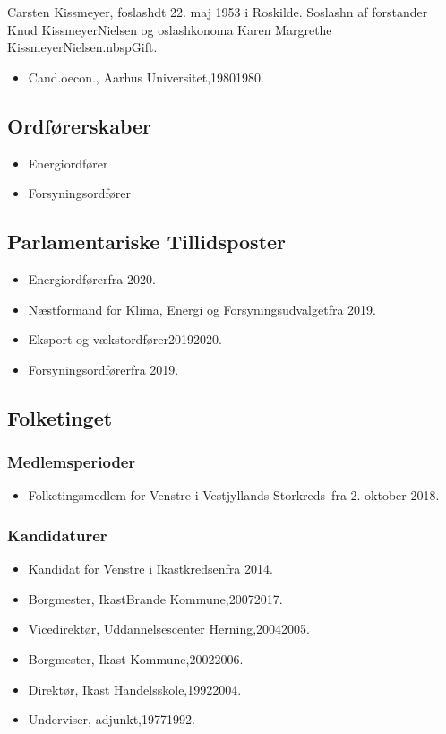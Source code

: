 \documentclass[11pt, a4paper]{awesome-cv}
\begin{document}
\makecvheader[R]
\makelettertitle
\begin{cvletter}
Carsten Kissmeyer, foslashdt 22. maj 1953 i Roskilde. Soslashn af forstander Knud KissmeyerNielsen og oslashkonoma Karen Margrethe KissmeyerNielsen.nbspGift.

\begin{itemize}
\item Cand.oecon., Aarhus Universitet,19801980.
\end{itemize}
\subsection*{Ordførerskaber}
\begin{itemize}
\item Energiordfører
\item Forsyningsordfører
\end{itemize}
\subsection*{Parlamentariske Tillidsposter}
\begin{itemize}
\item Energiordførerfra 2020.
\item Næstformand for Klima, Energi og Forsyningsudvalgetfra 2019.
\item Eksport og vækstordfører20192020.
\item Forsyningsordførerfra 2019.
\end{itemize}
\subsection*{Folketinget}
\subsubsection*{Medlemsperioder}
\begin{itemize}
\item Folketingsmedlem for Venstre i Vestjyllands Storkreds fra 2. oktober 2018.
\end{itemize}
\subsubsection*{Kandidaturer}
\begin{itemize}
\item Kandidat for Venstre i Ikastkredsenfra 2014.
\end{itemize}
\begin{itemize}
\item Borgmester, IkastBrande Kommune,20072017.
\item Vicedirektør, Uddannelsescenter Herning,20042005.
\item Borgmester, Ikast Kommune,20022006.
\item Direktør, Ikast Handelsskole,19922004.
\item Underviser, adjunkt,19771992.
\end{itemize}
\end{cvletter}
\end{document}
